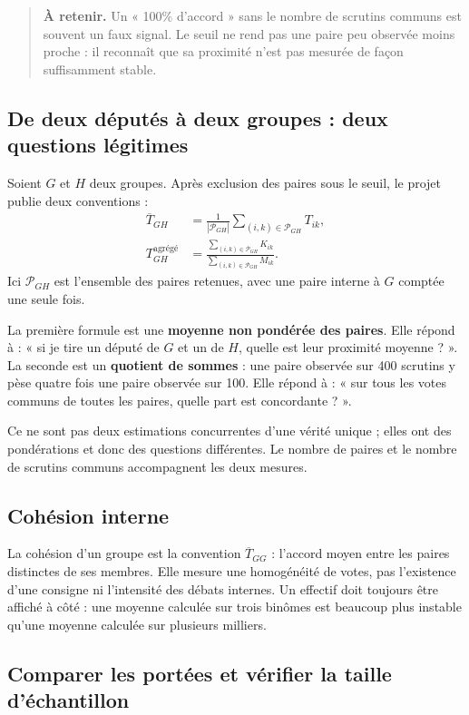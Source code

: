 \documentclass[11pt,a4paper]{article}
\newcommand{\important}[1]{\begin{quote}\small\color{blue!55!black}\textbf{À retenir.} #1\end{quote}}
\begin{document}
\important{Un « 100\% d'accord » sans le nombre de scrutins communs est souvent
un faux signal. Le seuil ne rend pas une paire peu observée moins proche : il
reconnaît que sa proximité n'est pas mesurée de façon suffisamment stable.}

\subsection{De deux députés à deux groupes : deux questions légitimes}

Soient $G$ et $H$ deux groupes. Après exclusion des paires sous le seuil, le
projet publie deux conventions :
\begin{align*}
 \overline T_{GH}&=\frac{1}{|\mathcal P_{GH}|}
 \sum_{(i,k)\in\mathcal P_{GH}}T_{ik},\\
 T^{\text{agrégé}}_{GH}&=
 \frac{\sum_{(i,k)\in\mathcal P_{GH}}K_{ik}}
 {\sum_{(i,k)\in\mathcal P_{GH}}M_{ik}}.
\end{align*}
Ici $\mathcal P_{GH}$ est l'ensemble des paires retenues, avec une paire interne
à $G$ comptée une seule fois.

La première formule est une \textbf{moyenne non pondérée des paires}. Elle
répond à : « si je tire un député de $G$ et un de $H$, quelle est leur proximité
moyenne ? ». La seconde est un \textbf{quotient de sommes} : une paire observée
sur 400 scrutins y pèse quatre fois une paire observée sur 100. Elle répond à :
« sur tous les votes communs de toutes les paires, quelle part est concordante ? ».

Ce ne sont pas deux estimations concurrentes d'une vérité unique ; elles ont des
pondérations et donc des questions différentes. Le nombre de paires et le
nombre de scrutins communs accompagnent les deux mesures.

\subsection{Cohésion interne}

La cohésion d'un groupe est la convention $\overline T_{GG}$ : l'accord moyen
entre les paires distinctes de ses membres. Elle mesure une homogénéité de votes,
pas l'existence d'une consigne ni l'intensité des débats internes. Un effectif
doit toujours être affiché à côté : une moyenne calculée sur trois binômes est
beaucoup plus instable qu'une moyenne calculée sur plusieurs milliers.

\subsection{Comparer les portées et vérifier la taille d'échantillon}
\end{document}

